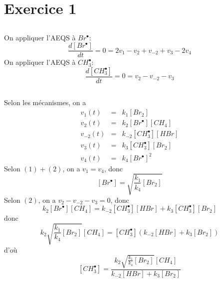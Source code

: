 \documentclass[a4paper,12pt]{book}
\begin{document}
\renewcommand{\labelitemi}{$\blacktriangleright$}
\renewcommand{\labelitemii}{$\bullet$}


\section{Exercice 1}
\subsection{}
On appliquer l’AEQS à $Br^\bullet$:
\begin{equation}
    \frac{d[Br^\bullet]}{dt}=0=2v_1-v_2+v_{-2}+v_3-2v_4
\end{equation}
On appliquer l’AEQS à $CH_3^\bullet$:
\begin{equation}
    \frac{d[CH_3^\bullet]}{dt}=0=v_2-v_{-2}-v_3
\end{equation}
\subsection{}
Selon les mécanismes, on a 
$$
\begin{array}{lcl}
    v_1(t) & = & k_1[Br_2]\\
    v_2(t) & = & k_2[Br^\bullet][CH_4]\\
    v_{-2}(t) & = & k_{-2}[CH_3^\bullet][HBr]\\
    v_3(t) & = & k_3[CH_3^\bullet][Br_2]\\
    v_4(t) & = & k_4[Br^\bullet]^2
\end{array}
$$
Selon $(1)+(2)$, on a $v_1=v_4$, donc 
$$
\boxed{[Br^\bullet]=\sqrt{\frac{k_1}{k_4}[Br_2]}}
$$
Selon $(2)$, on a $v_2-v_{-2}-v_3=0$, donc 
$$
k_2[Br^\bullet][CH_4]=k_{-2}[CH_3^\bullet][HBr]+k_3[CH_3^\bullet][Br_2]
$$
donc 
$$
k_2\sqrt{\frac{k_1}{k_4}[Br_2]}[CH_4]=[CH_3^\bullet](k_{-2}[HBr]+k_3[Br_2])
$$
d'où
$$
\boxed{[CH_3^\bullet]=\frac{k_2\sqrt{\frac{k_1}{k_4}[Br_2]}[CH_4]}{k_{-2}[HBr]+k_3[Br_2]}}
$$
\end{document}
